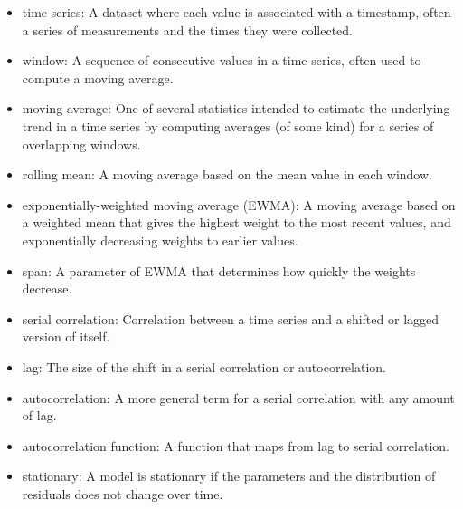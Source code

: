 \documentclass[12pt]{book}
\begin{document}
\begin{itemize}

\item time series: A dataset where each value is associated with
a timestamp, often a series of measurements and the times they
were collected.

\item window: A sequence of consecutive values in a time series,
often used to compute a moving average.

\item moving average: One of several statistics intended to estimate
the underlying trend in a time series by computing averages (of
some kind) for a series of overlapping windows.

\item rolling mean: A moving average based on the mean value in
each window.

\item exponentially-weighted moving average (EWMA): A moving
average based on a weighted mean that gives the highest weight
to the most recent values, and exponentially decreasing weights
to earlier values.  

\item span: A parameter of EWMA that determines how quickly the
weights decrease.

\item serial correlation: Correlation between a time series and
a shifted or lagged version of itself.

\item lag: The size of the shift in a serial correlation or
autocorrelation.

\item autocorrelation: A more general term for a serial correlation
with any amount of lag.

\item autocorrelation function: A function that maps from lag to
serial correlation.

\item stationary: A model is stationary if the parameters and the
distribution of residuals does not change over time.

\end{itemize}
\end{document}
